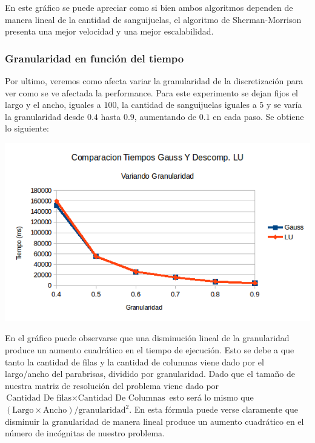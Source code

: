 En este gráfico se puede apreciar como si bien ambos algoritmos dependen de manera lineal de la cantidad de sanguijuelas, el algoritmo de Sherman-Morrison presenta una mejor velocidad y una mejor escalabilidad.

\subsubsection{Granularidad en función del tiempo}
Por ultimo, veremos como afecta variar la granularidad de la discretización para ver como se ve afectada la performance. Para este experimento se dejan fijos el largo y el ancho, iguales a $100$, la cantidad de sanguijuelas iguales a $5$ y se varía la granularidad desde $0.4$ hasta $0.9$, aumentando de $0.1$ en cada paso. Se obtiene lo siguiente:

\begin{center}
 \includegraphics[width=400pt]{imagenes/testeo/granuGauss.png}
\end{center}

En el gráfico puede observarse que una disminución lineal de la granularidad produce un aumento cuadrático en el tiempo de ejecución. Esto se debe a que tanto la cantidad de filas y la cantidad de columnas viene dado por el largo/ancho del parabrisas, dividido por granularidad. Dado que el tamaño de nuestra matriz de resolución del problema viene dado por $\text{Cantidad De filas} \times \text{Cantidad De Columnas}$ esto será lo mismo que  $(\text{Largo} \times \text{Ancho}) / \text{granularidad}^2$. En esta fórmula puede verse claramente que disminuir la granularidad de manera lineal produce un aumento cuadrático en el número de incógnitas de nuestro problema.

